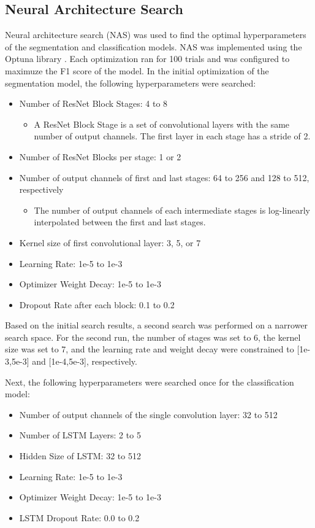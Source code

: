 \documentclass[conference]{IEEEtran}
\begin{document}
\subsection{Neural Architecture Search}
Neural architecture search (NAS) was used to find the optimal hyperparameters of the segmentation and classification models. NAS was implemented using the Optuna library \cite{akiba_2019}. Each optimization ran for 100 trials and was configured to maximuze the F1 score of the model. In the initial optimization of the segmentation model, the following hyperparameters were searched:
\begin{itemize}
    \item Number of ResNet Block Stages: 4 to 8
        \begin{itemize}
            \item A ResNet Block Stage is a set of convolutional layers with the same number of output channels. The first layer in each stage has a stride of 2.
        \end{itemize}
    \item Number of ResNet Blocks per stage: 1 or 2
    \item Number of output channels of first and last stages: 64 to 256 and 128 to 512, respectively
        \begin{itemize}
            \item The number of output channels of each intermediate stages is log-linearly interpolated between the first and last stages.
        \end{itemize}
    \item Kernel size of first convolutional layer: 3, 5, or 7
    \item Learning Rate: 1e-5 to 1e-3
    \item Optimizer Weight Decay: 1e-5 to 1e-3
    \item Dropout Rate after each block: 0.1 to 0.2
\end{itemize}

Based on the initial search results, a second search was performed on a narrower search space. For the second run, the number of stages was set to 6, the kernel size was set to 7, and the learning rate and weight decay were constrained to [1e-3,5e-3] and [1e-4,5e-3], respectively.

Next, the following hyperparameters were searched once for the classification model:
\begin{itemize}
    \item Number of output channels of the single convolution layer: 32 to 512
    \item Number of LSTM Layers: 2 to 5
    \item Hidden Size of LSTM: 32 to 512
    \item Learning Rate: 1e-5 to 1e-3
    \item Optimizer Weight Decay: 1e-5 to 1e-3
    \item LSTM Dropout Rate: 0.0 to 0.2
\end{itemize}
\end{document}
